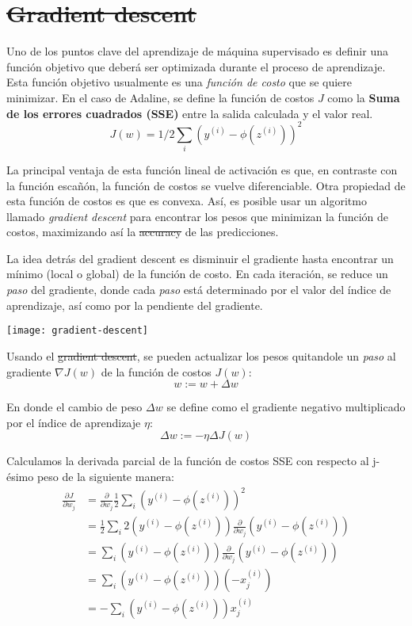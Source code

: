 \section{\sout{Gradient descent}}
Uno de los puntos clave del aprendizaje de máquina supervisado es
definir una función objetivo que deberá ser optimizada durante el
proceso de aprendizaje. Esta función objetivo usualmente es una
\textit{función de costo} que se quiere minimizar. En el caso de
Adaline, se define la función de costos $J$ como la \textbf{Suma de
  los errores cuadrados (SSE)} entre la salida calculada y el valor
real.
\begin{equation}
  J(w)=1/2 \sum_i (y^{(i)} - \phi (z^{(i)}))^2
\end{equation}

La principal ventaja de esta función lineal de activación es que,
en contraste con la función escañón, la función de costos se vuelve
diferenciable. Otra propiedad de esta función de costos es que es
convexa. Así, es posible usar un algoritmo llamado \textit{gradient descent}
para encontrar los pesos que minimizan la función de costos, maximizando así
la \sout{accuracy} de las predicciones.

La idea detrás del gradient descent es disminuir el gradiente hasta encontrar
un mínimo (local o global) de la función de costo. En cada iteración, se reduce
un \textit{paso} del gradiente, donde cada \textit{paso} está determinado por
el valor del índice de aprendizaje, así como por la pendiente del gradiente.

\texttt{[image: gradient-descent]}

Usando el \sout{gradient descent}, se pueden actualizar los pesos quitandole un \textit{paso}
al gradiente $\nabla J(w)$ de la función de costos $J(w)$:
\begin{equation}
  w := w + \Delta w
\end{equation}

En donde el cambio de peso $\Delta w$ se define como el gradiente negativo multiplicado
por el índice de aprendizaje $\eta$:
\begin{equation}
  \Delta w := -\eta \Delta J(w)
\end{equation}

Calculamos la derivada parcial de la función de costos SSE con respecto al
j-ésimo peso de la siguiente manera:
\begin{equation*}
\begin{split}
  \frac{\partial J}{\partial w_j} &= \frac{\partial}{\partial w_j}\frac{1}{2}\sum_i (y^{(i)} - \phi(z^{(i)}))^2 \\
  &= \frac{1}{2}\sum_i 2(y^{(i)} - \phi(z^{(i)}))\frac{\partial}{\partial w_j}(y^{(i)} - \phi(z^{(i)}))\\
  &= \sum_i (y^{(i)} - \phi(z^{(i)}))\frac{\partial}{\partial w_j}(y^{(i)} - \phi (z^{(i)}))\\
  &= \sum_i(y^{(i)} - \phi(z^{(i)}))(-x_j^{(i)})\\
  &= -\sum_i(y^{(i)} - \phi(z^{(i)}))x_j^{(i)}
\end{split}
\end{equation*}

